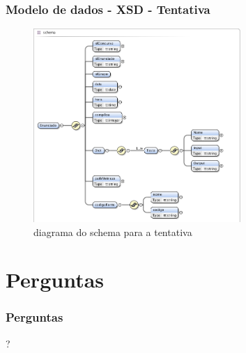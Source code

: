 \documentclass{beamer}
\begin{document}
\begin{frame}[fragile] \frametitle{Modelo de dados - XSD - Tentativa}
\begin{figure}[htbp]
\begin{center}
\includegraphics[width=0.7\textwidth]{../report1/Images/tentativa_schema}
\caption{diagrama do schema para a tentativa}\label{fig xsd tentativa}
\end{center}
\end{figure}
\end{frame}

\section*{Perguntas}
\begin{frame} \frametitle{Perguntas}
\begin{center}\huge{?}\end{center}
\end{frame}
\end{document}
